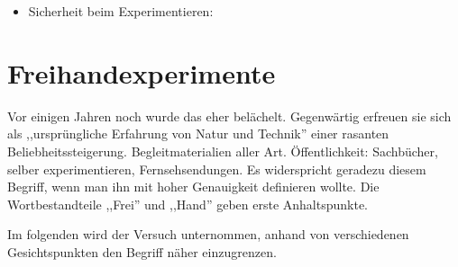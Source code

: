 \begin{itemize}
	\item
	Sicherheit beim Experimentieren: %
\end{itemize}

\bip\bip
\section{Freihandexperimente}

Vor einigen Jahren noch wurde das eher bel\"{a}chelt. Gegenw\"{a}rtig erfreuen sie
sich als ,,urspr\"{u}ngliche Erfahrung von Natur und Technik'' einer rasanten
Beliebheitssteigerung. %
\mip
Begleitmaterialien aller Art.
\mip
\"{O}ffentlichkeit: Sachb\"{u}cher, selber experimentieren, Fernsehsendungen.
\mip
Es widerspricht geradezu diesem Begriff, wenn man ihn
mit hoher Genauigkeit definieren wollte.
\mip
Die Wortbestandteile ,,Frei'' und ,,Hand'' geben erste Anhaltspunkte.


Im folgenden wird der Versuch unternommen, anhand von
verschiedenen Gesichtspunkten den Begriff n\"{a}her einzugrenzen.

